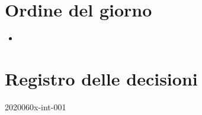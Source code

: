 \documentclass{article}
\begin{document}
\section{Ordine del giorno}%
\label{sec:ordine_del_giorno}

\begin{itemize}
  \item %
\end{itemize}

\section{}%
\label{sec:}

\newpage
\section{Registro delle decisioni}%
\label{sec:registro_delle_decisioni}

\begin{description}
  \item[2020060x-int-001] %
\end{description}

\end{document}
